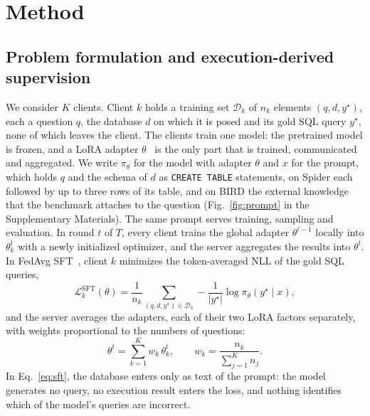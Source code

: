 \section{Method}\label{sec:method}

\subsection{Problem formulation and execution-derived supervision}\label{sec:formulation}\label{sec:supervision}

We consider $K$ clients. Client $k$ holds a training set $\mathcal{D}_k$
of $n_k$ elements $(q, d, y^\star)$, each a question $q$, the database
$d$ on which it is posed and its gold SQL query $y^\star$, none of which
leaves the client. The clients train one model: the pretrained model is
frozen, and a LoRA adapter $\theta$~\cite{hu2022lora} is the only part
that is trained, communicated and aggregated. We write $\pi_\theta$ for
the model with adapter $\theta$ and $x$ for the prompt, which holds $q$
and the schema of $d$ as \texttt{CREATE TABLE} statements, on Spider
each followed by up to three rows of its table, and on BIRD the external
knowledge that the benchmark attaches to the question
(Fig.~\ref{fig:prompt} in the Supplementary Materials). The same prompt
serves training, sampling and evaluation. In round $t$ of $T$, every
client trains the global adapter $\theta^{t-1}$ locally into
$\theta_k^{t}$ with a newly initialized optimizer, and the server
aggregates the results into $\theta^{t}$. In FedAvg SFT~\cite{mcmahan2017fedavg,ye2024openfedllm},
client $k$ minimizes the token-averaged NLL of the gold SQL queries,
\begin{equation}
  \mathcal{L}_k^{\mathrm{SFT}}(\theta) = \frac{1}{n_k}
    \sum_{(q, d, y^\star) \in \mathcal{D}_k}
    -\frac{1}{\lvert y^\star \rvert} \log \pi_\theta(y^\star \mid x),
  \label{eq:sft}
\end{equation}
and the server averages the adapters, each of their two LoRA factors
separately, with weights proportional to the numbers of questions:
\begin{equation}
  \theta^{t} = \sum_{k=1}^{K} w_k \, \theta_k^{t},
  \qquad
  w_k = \frac{n_k}{\sum_{j=1}^{K} n_j}.
  \label{eq:aggregation}
\end{equation}
In Eq.~\eqref{eq:sft}, the database enters only as text of the prompt:
the model generates no query, no execution result enters the loss, and
nothing identifies which of the model's queries are incorrect.

